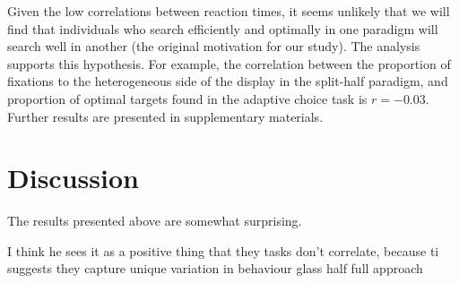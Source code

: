\documentclass[]{rsos}%
\begin{document}
Given the low correlations between reaction times, it seems unlikely that we will find that individuals who search efficiently and optimally in one paradigm will search well in another (the original motivation for our study). The analysis supports this hypothesis. For example, the correlation between the proportion of fixations to the heterogeneous side of the display in the split-half paradigm, and proportion of optimal targets found in the adaptive choice task is $r=-0.03$. Further results are presented in supplementary materials. 

\section{Discussion}

The results presented above are somewhat surprising. 


I think he sees it as a positive thing that they tasks don't correlate, because ti suggests they capture unique variation in behaviour
glass half full approach 



\end{document}
